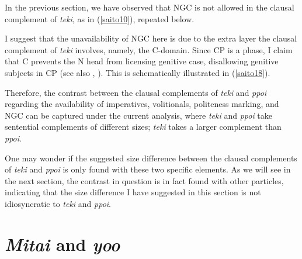 \documentclass[output=paper]{langscibook}
\begin{document}
In the previous section, we have observed that NGC is not allowed in the clausal complement of \textit{teki}, as in (\ref{saito10}), repeated below. 

\begin{exe}
\end{exe}

I suggest that the unavailability of NGC here is due to the extra layer the clausal complement of \emph{teki} involves, namely, the C-domain. Since CP is a phase, I claim that C prevents the N head from licensing genitive case, disallowing genitive subjects in CP (see also \citealt{miyagawa2011}, \citealt{ParkYoo2017}). This is schematically illustrated in (\ref{saito18}). 

\begin{exe}
\ex \label{saito18}
\end{exe}

Therefore, the contrast between the clausal complements of \emph{teki} and \emph{ppoi} regarding the availability of imperatives, volitionals, politeness marking, and NGC can be captured under the current analysis, where \emph{teki} and \emph{ppoi} take sentential complements of different sizes; \emph{teki} takes a larger complement than \emph{ppoi}.

One may wonder if the suggested size difference between the clausal complements of \emph{teki} and \emph{ppoi} is only found with these two specific elements. As we will see in the next section, the contrast in question is in fact found with other particles, indicating that the size difference I have suggested in this section is not idiosyncratic to \emph{teki} and \emph{ppoi}.

\section{\textit{Mitai} and \textit{yoo}} \label{saitos4}
\end{document}
